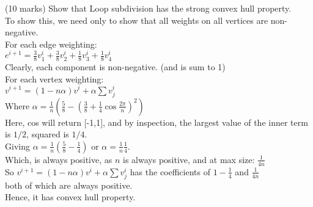 (10 marks) Show that Loop subdivision has the strong convex hull property. \\

To show this, we need only to show that all weights on all vertices are non-negative. \\
For each edge weighting:\\ 
$e^{i+1} = \frac{3}{8}v_1^i + \frac{3}{8} v_2^i + \frac{1}{8} v_3^i + \frac{1}{8} v_4^i$ \\
Clearly, each component is non-negative. (and is sum to 1)\\
For each vertex weighting: \\
$v^{i+1} = (1 - n \alpha )v^i + \alpha \sum v^i_j $ \\
Where $\alpha = \frac{1}{n} ( \frac{5}{8} - ( \frac{3}{8} + \frac{1}{4} \cos \frac{2 \pi }{n})^2 )$ \\
Here, cos will return [-1,1], and by inspection, the largest value of the inner term is $1/2$, squared is $1/4$. \\
Giving $\alpha = \frac{1}{n} ( \frac{5}{8} - \frac{1}{4} )$ or $\alpha = \frac{1}{n} \frac{1}{4}$. \\
Which, is always positive, as $n$ is always positive, and at max size: $\frac{1}{4 n}$ \\
So $v^{i+1} = (1 - n \alpha)v^i + \alpha \sum v^i_j$  has the coefficients of $1-\frac{1}{4}$ and $ \frac{1}{4n}$  \\
both of which are always positive. \\
Hence, it has convex hull property.
